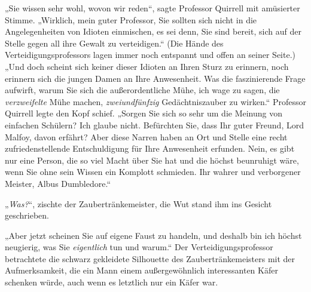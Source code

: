 „Sie wissen sehr wohl, wovon wir reden“, sagte Professor Quirrell mit amüsierter Stimme. „Wirklich, mein guter Professor, Sie sollten sich nicht in die Angelegenheiten von Idioten einmischen, es sei denn, Sie sind bereit, sich auf der Stelle gegen all ihre Gewalt zu verteidigen.“ (Die Hände des Verteidigungsprofessors lagen immer noch entspannt und offen an seiner Seite.) „Und doch scheint sich keiner dieser Idioten an Ihren Sturz zu erinnern, noch erinnern sich die jungen Damen an Ihre Anwesenheit. Was die faszinierende Frage aufwirft, warum Sie sich die außerordentliche Mühe, ich wage zu sagen, die \emph{verzweifelte} Mühe machen, \emph{zweiundfünfzig} Gedächtniszauber zu wirken.“ Professor Quirrell legte den Kopf schief. „Sorgen Sie sich so sehr um die Meinung von einfachen Schülern? Ich glaube nicht. Befürchten Sie, dass Ihr guter Freund, Lord Malfoy, davon erfährt? Aber diese Narren haben an Ort und Stelle eine recht zufriedenstellende Entschuldigung für Ihre Anwesenheit erfunden. Nein, es gibt nur eine Person, die so viel Macht über Sie hat und die höchst beunruhigt wäre, wenn Sie ohne sein Wissen ein Komplott schmieden. Ihr wahrer und verborgener Meister, Albus Dumbledore.“

„\emph{Was?}“, zischte der Zaubertränkemeister, die Wut stand ihm ins Gesicht geschrieben.

„Aber jetzt scheinen Sie auf eigene Faust zu handeln, und deshalb bin ich höchst neugierig, was Sie \emph{eigentlich} tun und warum.“ Der Verteidigungsprofessor betrachtete die schwarz gekleidete Silhouette des Zaubertränkemeisters mit der Aufmerksamkeit, die ein Mann einem außergewöhnlich interessanten Käfer schenken würde, auch wenn es letztlich nur ein Käfer war.

